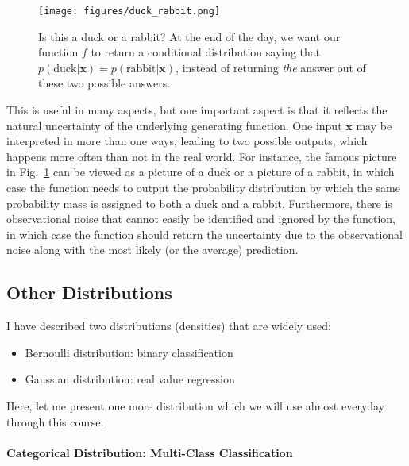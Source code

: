 \documentclass{report}
\newcommand{\vect}[1]{\mathbf{#1}}
\newcommand{\vx}[0]{\vect{x}}
\begin{document}
\begin{figure}[ht]
    \centering
    \begin{minipage}{0.6\textwidth}
        \texttt{[image: figures/duck\_rabbit.png]}
    \end{minipage}
    \hfill
    \begin{minipage}{0.39\textwidth}
        \caption{Is this a duck or a rabbit? \citep{kuhn2012structure} At the end
        of the day, we want our function $f$ to return a conditional
    distribution saying that $p(\text{duck}|\vx) = p(\text{rabbit}|\vx)$,
instead of returning {\em the} answer out of these two possible answers.}
        \label{fig:duck_rabbit}
    \end{minipage}
\end{figure}

This is useful in many aspects, but one important aspect is that it reflects the
natural uncertainty of the underlying generating function. One input $\vx$ may
be interpreted in more than one ways, leading to two possible outputs, which
happens more often than not in the real world. For instance, the famous picture
in Fig.~\ref{fig:duck_rabbit} can be viewed as a picture of a duck or a picture
of a rabbit, in which case the function needs to output the probability
distribution by which the same probability mass is assigned to both a duck and a
rabbit. Furthermore, there is observational noise that cannot easily be
identified and ignored by the function, in which case the function should return
the uncertainty due to the observational noise along with the most likely (or
the average) prediction.

\subsection{Other Distributions}
\label{sec:other_dist}

I have described two distributions (densities) that are widely used: 
\begin{itemize}
    \itemsep 0em
    \item Bernoulli distribution: binary classification
    \item Gaussian distribution: real value regression
\end{itemize}
Here, let me present one more distribution which we will use almost everyday
through this course.

\paragraph{Categorical Distribution: Multi-Class Classification}
\end{document}
